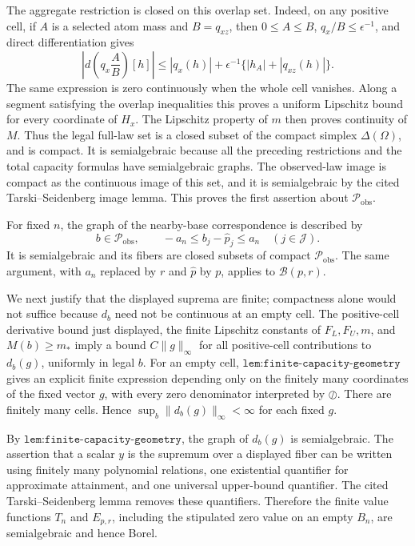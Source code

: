The aggregate restriction is closed on this overlap set.  Indeed, on any positive cell, if \(A\) is a selected atom mass and \(B=q_{xz}\), then \(0\le A\le B\), \(q_x/B\le\epsilon^{-1}\), and direct differentiation gives
\[
\left|d\left(q_x\frac{A}{B}\right)[h]\right|
\le |q_x(h)|+\epsilon^{-1}\{|h_A|+|q_{xz}(h)|\}.
\]
The same expression is zero continuously when the whole cell vanishes.  Along a segment satisfying the overlap inequalities this proves a uniform Lipschitz bound for every coordinate of \(H_x\).  The Lipschitz property of \(m\) then proves continuity of \(M\).  Thus the legal full-law set is a closed subset of the compact simplex \(\Delta(\Omega)\), and is compact.  It is semialgebraic because all the preceding restrictions and the total capacity formulas have semialgebraic graphs.  The observed-law image is compact as the continuous image of this set, and it is semialgebraic by the cited Tarski--Seidenberg image lemma.  This proves the first assertion about \(\mathcal P_{\mathrm{obs}}\).

For fixed \(n\), the graph of the nearby-base correspondence is described by
\[
b\in\mathcal P_{\mathrm{obs}},\qquad -a_n\le b_j-\widehat p_j\le a_n
\quad(j\in\mathcal J).
\]
It is semialgebraic and its fibers are closed subsets of compact \(\mathcal P_{\mathrm{obs}}\).  The same argument, with \(a_n\) replaced by \(r\) and \(\widehat p\) by \(p\), applies to \(\mathcal B(p,r)\).

We next justify that the displayed suprema are finite; compactness alone would not suffice because \(d_b\) need not be continuous at an empty cell.  The positive-cell derivative bound just displayed, the finite Lipschitz constants of \(F_L,F_U,m\), and \(M(b)\ge m_*\) imply a bound \(C\|g\|_\infty\) for all positive-cell contributions to \(d_b(g)\), uniformly in legal \(b\).  For an empty cell, \(\texttt{lem:finite-capacity-geometry}\) gives an explicit finite expression depending only on the finitely many coordinates of the fixed vector \(g\), with every zero denominator interpreted by \(\oslash\).  There are finitely many cells.  Hence \(\sup_b\|d_b(g)\|_\infty<\infty\) for each fixed \(g\).

By \(\texttt{lem:finite-capacity-geometry}\), the graph of \(d_b(g)\) is semialgebraic.  The assertion that a scalar \(y\) is the supremum over a displayed fiber can be written using finitely many polynomial relations, one existential quantifier for approximate attainment, and one universal upper-bound quantifier.  The cited Tarski--Seidenberg lemma removes these quantifiers.  Therefore the finite value functions \(T_n\) and \(E_{p,r}\), including the stipulated zero value on an empty \(B_n\), are semialgebraic and hence Borel.

